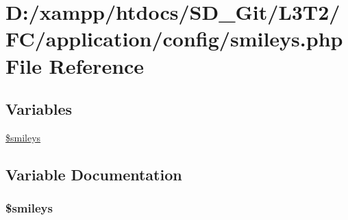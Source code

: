 \hypertarget{application_2config_2smileys_8php}{}\section{D\+:/xampp/htdocs/\+S\+D\+\_\+\+Git/\+L3\+T2/\+F\+C/application/config/smileys.php File Reference}
\label{application_2config_2smileys_8php}
\subsection*{Variables}
\begin{DoxyCompactItemize}
\item 
\hyperlink{application_2config_2smileys_8php_a3f21d1c0fb54cb2010e7c7004f29f74c}{\$smileys}
\end{DoxyCompactItemize}


\subsection{Variable Documentation}
\hypertarget{application_2config_2smileys_8php_a3f21d1c0fb54cb2010e7c7004f29f74c}{}
\subsubsection[{\$smileys}]{\setlength{\rightskip}{0pt plus 5cm}\$smileys}\label{application_2config_2smileys_8php_a3f21d1c0fb54cb2010e7c7004f29f74c}
